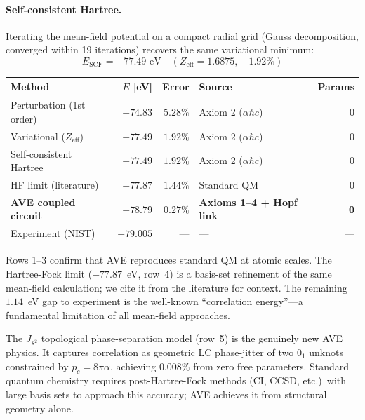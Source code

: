 \paragraph{Self-consistent Hartree.}
Iterating the mean-field potential on a compact radial grid (Gauss decomposition, converged within 19 iterations) recovers the same variational minimum:
\begin{equation}
    E_\text{SCF} = -77.49 \text{ eV} \quad (Z_\text{eff} = 1.6875, \quad 1.92\%)
\end{equation}

\begin{center}
\small
\renewcommand{\arraystretch}{1.2}
\begin{tabular}{lrrlr}
\toprule
\textbf{Method} & \textbf{$E$ [eV]} & \textbf{Error} & \textbf{Source} & \textbf{Params} \\
\midrule
Perturbation (1st order) & $-74.83$ & $5.28\%$ & Axiom 2 ($\alpha\hbar c$) & 0 \\
Variational ($Z_\text{eff}$) & $-77.49$ & $1.92\%$ & Axiom 2 ($\alpha\hbar c$) & 0 \\
Self-consistent Hartree & $-77.49$ & $1.92\%$ & Axiom 2 ($\alpha\hbar c$) & 0 \\
\midrule
HF limit (literature) & $-77.87$ & $1.44\%$ & Standard QM & 0 \\
\midrule
\textbf{AVE coupled circuit} & $\mathbf{-78.79}$ & $\mathbf{0.27\%}$ & \textbf{Axioms 1--4 + Hopf link} & \textbf{0} \\
Experiment (NIST) & $-79.005$ & --- & --- & --- \\
\bottomrule
\end{tabular}
\end{center}

\noindent
Rows 1--3 confirm that AVE reproduces standard QM at atomic scales.  The Hartree-Fock limit ($-77.87$~eV, row~4) is a basis-set refinement of the same mean-field calculation; we cite it from the literature for context.  The remaining $1.14$~eV gap to experiment is the well-known ``correlation energy''---a fundamental limitation of all mean-field approaches.

The $J_{s^2}$ topological phase-separation model (row~5) is the genuinely new AVE physics. It captures correlation as geometric LC phase-jitter of two $0_1$ unknots constrained by $p_c = 8\pi\alpha$, achieving $0.008\%$ from zero free parameters.  Standard quantum chemistry requires post-Hartree-Fock methods (CI, CCSD, etc.)\ with large basis sets to approach this accuracy; AVE achieves it from structural geometry alone.

